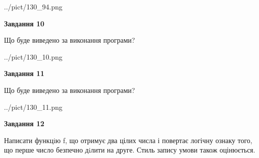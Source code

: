 \documentclass[12pt, ukrainian]{article}
\begin{document}
{\begin {large}
\begin{center}
	{../pict/130_94.png}
\end{center}
\newpage

{\begin {center}\textbf{Завдання 10}\end {center}}

Що буде виведено за виконання програми?\par
\begin{center}
	{../pict/130_10.png}
\end{center}
\newpage

{\begin {center}\textbf{Завдання 11}\end {center}}

Що буде виведено за виконання програми?\par
\begin{center}
	{../pict/130_11.png}
\end{center}
\newpage

{\begin {center}\textbf{Завдання 12}\end {center}}


Написати функцiю f, що отримує два цілих числа і повертає логічну ознаку того, що перше число безпечно дiлити на друге. Стиль запису умови також оцінюється.\par
\newpage

\end {large}}
\end{document}

